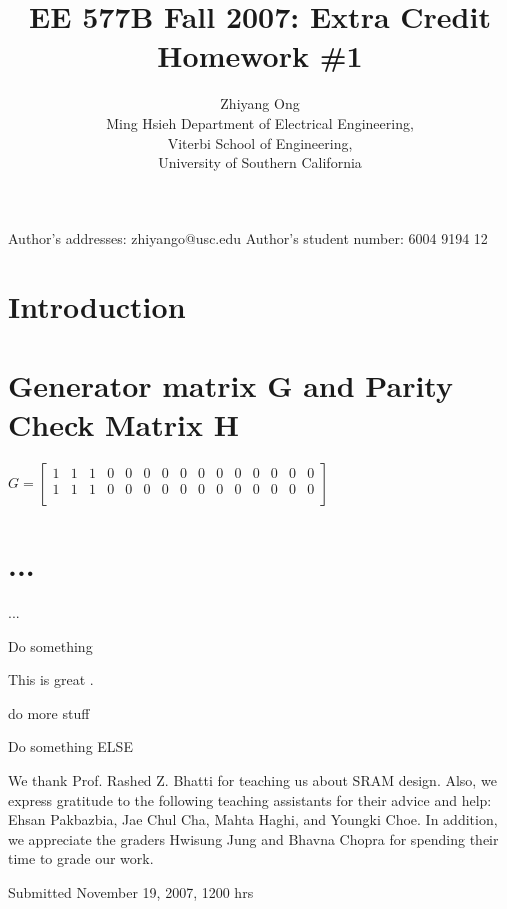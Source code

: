 \documentclass[ee577b,acmnow]{acmtrans2m}
\title{EE 577B Fall 2007: Extra Credit Homework \#1}
\author{Zhiyang Ong\\
Ming Hsieh Department of Electrical Engineering,\\
Viterbi School of Engineering,\\
University of Southern California
}
\begin{document}
\setcounter{page}{1}
            
\begin{bottomstuff} 
Author's addresses: zhiyango@usc.edu \newline
Author's student number: 6004 9194 12 \newline
\end{bottomstuff}
            
\maketitle

\section{Introduction}

\section{Generator matrix G and Parity Check Matrix H}

$G = \left [ \begin{array}{ccccccccccccccc}
1 & 1 & 1 & 0 & 0 & 0 & 0 & 0 & 0 & 0 & 0 & 0 & 0 & 0 & 0 \\
1 & 1 & 1 & 0 & 0 & 0 & 0 & 0 & 0 & 0 & 0 & 0 & 0 & 0 & 0 \\
\end{array} \right ] $

\section{...}
...


\newpage
Do something

This is great \cite{Weste05,Rabaey03,Kang03,Sutherland99}.

\newpage
do more stuff

\newpage
Do something ELSE

\begin{acks}
We thank Prof. Rashed Z. Bhatti for teaching us about SRAM design.
 Also, we express gratitude to the following teaching assistants for
 their advice and help: Ehsan Pakbazbia, Jae Chul Cha, Mahta Haghi,
 and Youngki Choe. In addition, we appreciate the graders Hwisung
 Jung and Bhavna Chopra for spending their time to grade our work.
\end{acks}

%
%


\begin{received}
Submitted November 19, 2007, 1200 hrs
\end{received}
\end{document}
